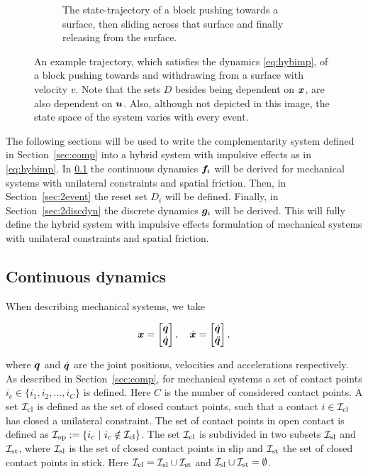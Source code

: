 \documentclass[../DC2017114Bouma.tex]{subfiles}
\begin{document}
\begin{figure}[h]
\begin{subfigure}[b]{\textwidth}
\caption{The state-trajectory of a block pushing towards a surface, then sliding across that surface and finally releasing from the surface.}
\label{fig:2exampletraj}
\end{subfigure}
\caption{An example trajectory, which satisfies the dynamics \eqref{eq:hybimp}, of a block pushing towards and withdrawing from a surface with velocity $v$.  Note that the sets $D$ besides being dependent on ${\boldsymbol{x}}$, are also dependent on ${\boldsymbol{u}}$. Also, although not depicted in this image, the state space of the system varies with every event.}
\label{fig:2example}
\end{figure}

The following sections will be used to write the complementarity system defined in Section~\ref{sec:comp} into a hybrid system with impulsive effects as in \eqref{eq:hybimp}. In \ref{sec:2contdyn} the continuous dynamics ${\boldsymbol{f}}_i$ will be derived for mechanical systems with unilateral constraints and spatial friction. Then, in Section~\ref{sec:2event} the reset set $D_i$ will be defined. Finally, in Section~\ref{sec:2discdyn} the discrete dynamics ${\boldsymbol{g}}_i$ will be derived. This will fully define the hybrid system with impulsive effects formulation of mechanical systems with unilateral constraints and spatial friction.

\subsection{Continuous dynamics}\label{sec:2contdyn}
When describing mechanical systems, we take 

\begin{align}
{\boldsymbol{x}} = \begin{bmatrix}
{\boldsymbol{q}}\\ \dot{{\boldsymbol{q}}}
\end{bmatrix},\quad
\dot{{\boldsymbol{x}}} = \begin{bmatrix}
\dot{{\boldsymbol{q}}}\\ \ddot{{\boldsymbol{q}}}
\end{bmatrix},
\end{align}

where ${\boldsymbol{q}}$ and $\dot{{\boldsymbol{q}}}$ are the joint positions, velocities and accelerations respectively. As described in Section~\ref{sec:comp}, for mechanical systems a set of contact points $i_c\in\{i_1,i_2,...,i_C\}$ is defined. Here $C$ is the number of considered contact points. A set $\mathcal{I}_{\text{cl}}$ is defined as the set of closed contact points, such that a contact $i\in\mathcal{I}_{\text{cl}}$ has closed a unilateral constraint. The set of contact points in open contact is defined as $\Ic_{\text{op}} := \{i_c\ |\ i_c\notin\Ic_{\text{cl}}\}$. The set $\mathcal{I}_{\text{cl}}$ is subdivided in two subsets $\mathcal{I}_{\text{sl}}$ and $\mathcal{I}_{\text{st}}$, where $\mathcal{I}_{\text{sl}}$ is the set of closed contact points in slip and $\mathcal{I}_{\text{st}}$ the set of closed contact points in stick. Here $\mathcal{I}_{\text{cl}} =\mathcal{I}_{\text{sl}}\cup\mathcal{I}_{\text{st}}$ and $\mathcal{I}_{\text{sl}}\cup\mathcal{I}_{\text{st}}=\emptyset$. 
\end{document}
